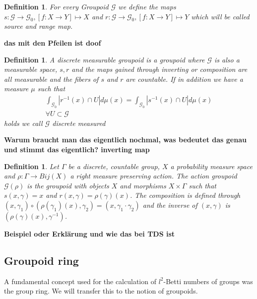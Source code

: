 \documentclass[12pt,a4paper]{scrartcl}
\newtheorem{Definition}[Theorem]{Definition}
\numberwithin{equation}{section}
\newcommand{\2}{\mathbb{Z} / 2 \mathbb{Z}}
\newcommand{\G}{\mathcal{G}}
\begin{document}
\begin{Definition}
	For every Groupoid $\mathcal{G}$ we define the maps $s: \mathcal{G} \to \mathcal{G}_0, [f:X \to Y] \mapsto X$ and $r: \mathcal{G} \to \mathcal{G}_0, [f:X \to Y] \mapsto Y$ which will be called source and range map.
\end{Definition}
\textbf{das mit den Pfeilen ist doof}
\begin{Definition}
	A discrete measurable groupoid is a groupoid where $\mathcal{G}$ is also a measurable space, $s, r$ and the maps gained through inverting or composition are all measurable and the fibers of $s$ and $r$ are countable.
	If in addition we have a measure $\mu$ such that 
	\begin{align*}
		\int_{\mathcal{G}_0} |r^{-1}(x) \cap U| d\mu(x) = \int_{\mathcal{G}_0} |s^{-1}(x) \cap U| d\mu(x) \\ \forall U \subset \mathcal{G}
	\end{align*}
	holds we call $\mathcal{G}$ discrete measured
\end{Definition}
\textbf{Warum braucht man das eigentlich nochmal, was bedeutet das genau und stimmt das eigentlich? inverting map}
\begin{Definition}
	Let $\Gamma$ be a discrete, countable group, $X$ a probability measure space and $\rho: \Gamma \to Bij(X)$ a right measure preserving action. The action groupoid $\G(\rho)$ is the groupoid with objects $X$ and morphisms $X \times \Gamma$ such that $s(x,\gamma) = x$ and $r(x, \gamma) = \rho(\gamma) (x)$. The composition is defined through $(x, \gamma_1) \circ (\rho(\gamma_1) (x), \gamma_2) = (x, \gamma_1 \cdot \gamma_2)$ and the inverse of $(x, \gamma)$ is $(\rho(\gamma) (x), \gamma^{-1})$.
\end{Definition}
\textbf{Beispiel oder Erklärung und wie das bei TDS ist}

\subsection{Groupoid ring}
A fundamental concept used for the calculation of $l^2$-Betti numbers of groups was the group ring. We will transfer this to the notion of groupoids.
\end{document}
